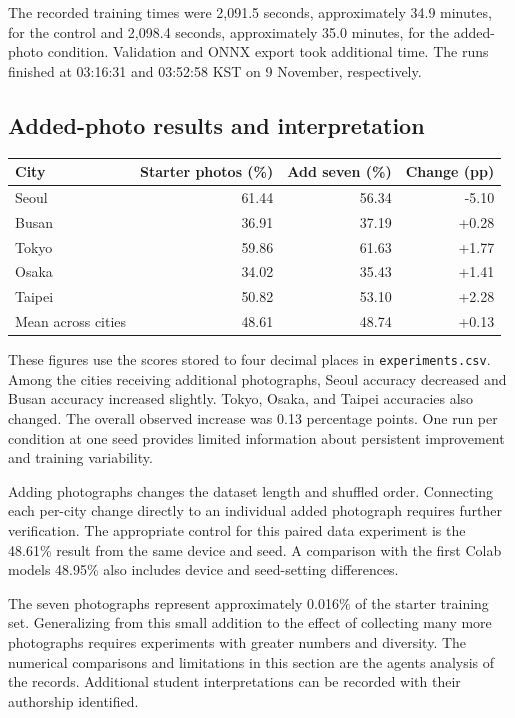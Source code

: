 \documentclass[11pt]{article}
\begin{document}
The recorded training times were 2,091.5 seconds, approximately 34.9 minutes,
for the control and 2,098.4 seconds, approximately 35.0 minutes, for the
added-photo condition. Validation and ONNX export took additional time.
The runs finished at 03:16:31 and 03:52:58 KST on 9 November, respectively.

\subsection{Added-photo results and interpretation}

\begin{center}\small
\begin{tabular}{lrrr}
\toprule
City & Starter photos (\%) & Add seven (\%) & Change (pp) \\
\midrule
Seoul & 61.44 & 56.34 & -5.10 \\
Busan & 36.91 & 37.19 & +0.28 \\
Tokyo & 59.86 & 61.63 & +1.77 \\
Osaka & 34.02 & 35.43 & +1.41 \\
Taipei & 50.82 & 53.10 & +2.28 \\
\midrule
Mean across cities & 48.61 & 48.74 & +0.13 \\
\bottomrule
\end{tabular}
\end{center}

These figures use the scores stored to four decimal places in
\texttt{experiments.csv}. Among the cities receiving additional photographs,
Seoul accuracy decreased and Busan accuracy increased slightly. Tokyo, Osaka,
and Taipei accuracies also changed. The overall observed increase was
0.13 percentage points. One run per condition at one seed provides limited
information about persistent improvement and training variability.

Adding photographs changes the dataset length and shuffled order. Connecting
each per-city change directly to an individual added photograph requires
further verification. The appropriate control for this paired data experiment
is the 48.61\% result from the same device and seed. A comparison with the
first Colab model\textquotesingle{}s 48.95\% also includes device and seed-setting differences.

The seven photographs represent approximately 0.016\% of the starter training
set. Generalizing from this small addition to the effect of collecting many
more photographs requires experiments with greater numbers and diversity.
The numerical comparisons and limitations in this section are the agent\textquotesingle{}s
analysis of the records. Additional student interpretations can be recorded
with their authorship identified.
\end{document}
